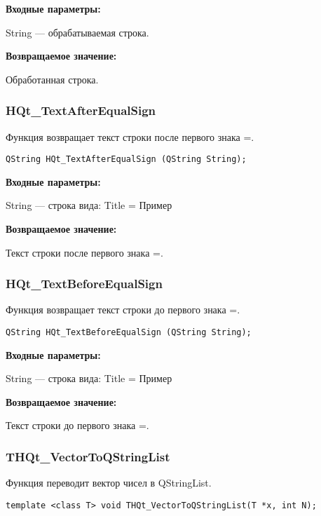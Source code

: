 \documentclass[a4paper,12pt]{article}
\begin{document}
\textbf{Входные параметры:}

String --- обрабатываемая строка.

\textbf{Возвращаемое значение:}
 
Обработанная строка.


\subsubsection{HQt\_TextAfterEqualSign}\label{HQt_TextAfterEqualSign}

Функция возвращает текст строки после первого знака =.


\begin{lstlisting}[label=code_syntax_HQt_TextAfterEqualSign,caption=Синтаксис]
QString HQt_TextAfterEqualSign (QString String);
\end{lstlisting}

\textbf{Входные параметры:}
 
String --- строка вида: Title = Пример

\textbf{Возвращаемое значение:}

Текст строки после первого знака =.


\subsubsection{HQt\_TextBeforeEqualSign}\label{HQt_TextBeforeEqualSign}

Функция возвращает текст строки до первого знака =.


\begin{lstlisting}[label=code_syntax_HQt_TextBeforeEqualSign,caption=Синтаксис]
QString HQt_TextBeforeEqualSign (QString String);
\end{lstlisting}

\textbf{Входные параметры:}
 
String --- строка вида: Title = Пример

\textbf{Возвращаемое значение:}

Текст строки до первого знака =.


\subsubsection{THQt\_VectorToQStringList}\label{THQt_VectorToQStringList}

Функция переводит вектор чисел в QStringList.


\begin{lstlisting}[label=code_syntax_THQt_VectorToQStringList,caption=Синтаксис]
template <class T> void THQt_VectorToQStringList(T *x, int N);
\end{lstlisting}
\end{document}
